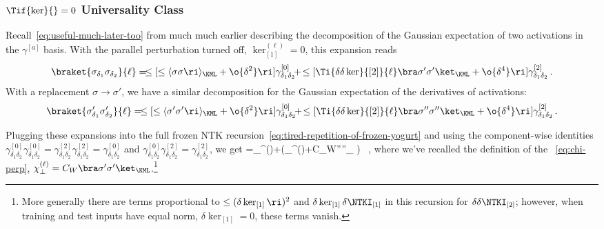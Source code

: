\subsubsection{\texorpdfstring{$\Tif{\ker}{}=0$}{K*=0} Universality Class}
Recall~\eqref{eq:useful-much-later-too} from much much earlier describing the decomposition of the Gaussian expectation of two activations in the $\gamma^{[a]}$ basis. With the parallel perturbation turned off, $\ker_{[1]}^{(\ell)}=0$, this expansion reads 
\begin{align}
\braket{\sigma_{\delta_1} \sigma_{\delta_2}}{\ell}=\!\le[\le\langle \sigma\sigma\ri\rangle_{\KML}+\o{\delta^2}\ri] \gamma^{[0]}_{\delta_1\delta_2}\!+\!\le[\Ti{\delta\delta\ker}{[2]}{\ell}\bra \sigma'\sigma'\ket_{\KML}+\o{\delta^4}\ri] \gamma^{[2]}_{\delta_1\delta_2}\, .
\end{align}
With a replacement $\sigma\to\sigma'$, we have a similar decomposition for the Gaussian expectation of the derivatives of activations:
\begin{align}\label{eq:primeprimeprimeprime}
\braket{\sigma'_{\delta_1} \sigma'_{\delta_2}}{\ell}=\!\le[\le\langle \sigma'\sigma'\ri\rangle_{\KML}+\o{\delta^2}\ri] \gamma^{[0]}_{\delta_1\delta_2}\!+\!\le[\Ti{\delta\delta\ker}{[2]}{\ell}\bra \sigma''\sigma''\ket_{\KML}+\o{\delta^4}\ri] \gamma^{[2]}_{\delta_1\delta_2}\, .
\end{align}

Plugging these expansions into the full frozen NTK recursion~\eqref{eq:tired-repetition-of-frozen-yogurt} and 
using the component-wise identities $\gamma^{[0]}_{\delta_1\delta_2}\gamma^{[0]}_{\delta_1\delta_2}=\gamma^{[2]}_{\delta_1\delta_2}\gamma^{[2]}_{\delta_1\delta_2}=\gamma^{[0]}_{\delta_1\delta_2}$ and $\gamma^{[0]}_{\delta_1\delta_2}\gamma^{[2]}_{\delta_1\delta_2}=\gamma^{[2]}_{\delta_1\delta_2}$, we get
\be\label{eq:deltadeltaNTK-recursion}
=\chi_{\perp}^{(\ell)}\Ti{\delta\delta\NTKI}{[2]}{\ell}+\le(\chi_{\perp}^{(\ell)}+C_W\bra \sigma''\sigma''\ket_{\KML} \Ti{\NTKI}{\M\M}{\ell}\ri) \Ti{\delta\delta\ker}{[2]}{\ell}\, ,
\ee
where we've recalled the definition of the ~\eqref{eq:chi-perp}, $\chi_{\perp}^{(\ell)}=C_W\bra \sigma'\sigma'\ket_{\KML}$.\footnote{More generally there are terms proportional to $\le(\delta\ker_{[1]}\ri)^2$ and $\delta\ker_{[1]} \delta\NTKI_{[1]}$ in this recursion for $\delta\delta\NTKI_{[2]}$; however, when training and test inputs have equal norm, $\delta\ker_{[1]}=0$, these terms vanish. 
}

